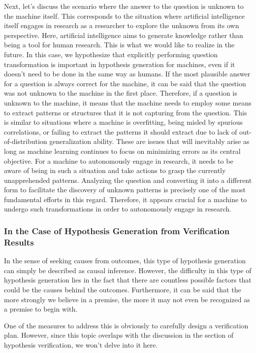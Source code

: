 Next, let's discuss the scenario where the answer to the question is unknown to the machine itself. This corresponds to the situation where artificial intelligence itself engages in research as a researcher to explore the unknown from its own perspective. Here, artificial intelligence aims to generate knowledge rather than being a tool for human research. This is what we would like to realize in the future. In this case, we hypothesize that explicitly performing question transformation is important in hypothesis generation for machines, even if it doesn't need to be done in the same way as humans. If the most plausible answer for a question is always correct for the machine, it can be said that the question was not unknown to the machine in the first place. Therefore, if a question is unknown to the machine, it means that the machine needs to employ some means to extract patterns or structures that it is not capturing from the question. This is similar to situations where a machine is overfitting, being misled by spurious correlations, or failing to extract the patterns it should extract due to lack of out-of-distribution generalization ability. These are issues that will inevitably arise as long as machine learning continues to focus on minimizing errors as its central objective. For a machine to autonomously engage in research, it needs to be aware of being in such a situation and take actions to grasp the currently unapprehended patterns. Analyzing the question and converting it into a different form to facilitate the discovery of unknown patterns is precisely one of the most fundamental efforts in this regard. Therefore, it appears crucial for a machine to undergo such transformations in order to autonomously engage in research.

\subsubsection{In the Case of Hypothesis Generation from Verification Results}
In the sense of seeking causes from outcomes, this type of hypothesis generation can simply be described as causal inference. However, the difficulty in this type of hypothesis generation lies in the fact that there are countless possible factors that could be the causes behind the outcomes. Furthermore, it can be said that the more strongly we believe in a premise, the more it may not even be recognized as a premise to begin with.

One of the measures to address this is obviously to carefully design a verification plan. However, since this topic overlaps with the discussion in the section of hypothesis verification, we won't delve into it here.

